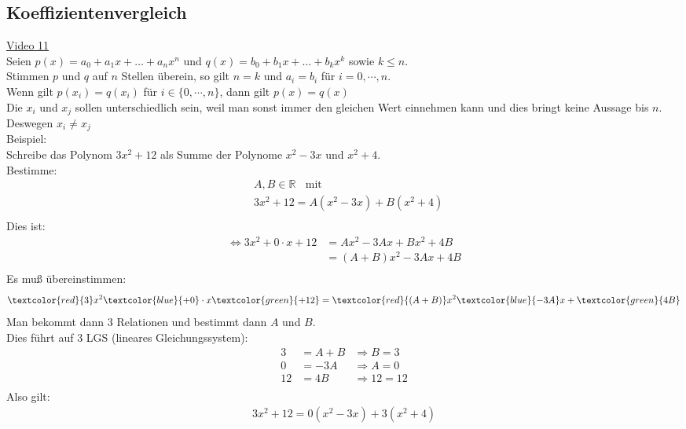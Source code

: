 \subsection{Koeffizientenvergleich}
\href{https://youtu.be/Zipnj1HU4aU}{Video 11}\\
Seien $ p(x)=a_0+a_1x+\ldots+a_nx^n$ und $q(x) =b_0+b_1x+\ldots +b_kx^k $ sowie $ k\leq n $.\\
Stimmen $ p $ und $ q $ auf $ n $ Stellen überein, so gilt $ n=k $ und $ a_i=b_i $ für $ i=0, \cdots ,n $.\vspace*{2mm}\\
Wenn gilt $ p(x_i)=q(x_i) $ für $ i\in\{0,\cdots ,n\} $, dann gilt $ p(x)=q(x) $\\
Die $ x_i $ und $ x_j $ sollen unterschiedlich sein, weil man sonst immer den gleichen Wert einnehmen kann und dies bringt keine Aussage bis $ n $. Deswegen $ x_i\neq x_j $\vspace*{2mm}\\
Beispiel:\\
Schreibe das Polynom $ 3x^2+12 $ als Summe der Polynome $ x^2-3x $ und $ x^2+4 $.\\
Bestimme:\\
\begin{align*}
&A,B \in \mathbb{R}\;\;\text{ mit}\\
&3x^2+12=A(x^2-3x)+B(x^2+4)\\
\end{align*}
Dies ist:\\
\begin{align*}
\Leftrightarrow 3x^2+0\cdot x+12&=Ax^2-3Ax+Bx^2+4B\\
&=(A+B)x^2-3Ax+4B\\
\end{align*}
Es muß übereinstimmen:\\
\begin{align*}
\textcolor{red}{3}x^2\textcolor{blue}{+0}\cdot x \textcolor{green}{+12}=\textcolor{red}{(A+B)}x^2\textcolor{blue}{-3A}x+\textcolor{green}{4B}\\
\end{align*}
Man bekommt dann 3 Relationen und bestimmt dann $ A $ und $ B $.\\
Dies führt auf 3 LGS (lineares Gleichungssystem):\\
\begin{align*}
3&=A+B&\Rightarrow B=3\\
0&=-3A&\Rightarrow A=0\\
12&=4B&\Rightarrow 12=12\\
\end{align*}
Also gilt:\\
\begin{align*}
3x^2+12=0(x^2-3x)+3(x^2+4)\\
\end{align*}
